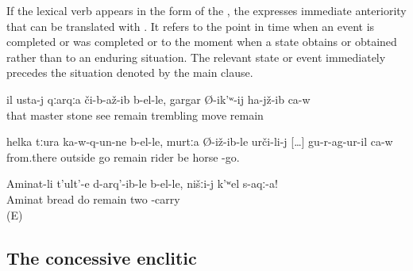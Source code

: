 If the lexical verb appears in the form of the , the  expresses immediate anteriority that can be translated with . It refers to the point in time when an event is completed or was completed or to the moment when a state obtains or obtained rather than to an enduring situation. The relevant state or event immediately precedes the situation denoted by the main clause.
%
\begin{exe}
	\ex	\label{ex:When / as soon as the master saw the stone, he trembled (started to tremble)}
	\gll	il	usta-j	qːarqːa	či-b-až-ib	b-el-le,	gargar	Ø-ik'ʷ-ij	ha-jž-ib	ca-w\\
		that	master	stone	see	remain	trembling	move	remain \\
	\glt	{}

	\ex	\label{ex:When / as soon as he went out from there, he mounted the horse}
	\gll	helka	tːura	ka-w-q-un-ne	b-el-le,	murtːa	Ø-iž-ib-le	urči-li-j [\ldots]	gu-r-ag-ur-il	ca-w\\
		from.there	outside	go	remain	rider	be	horse	{}	-go.	\\
	\glt	{}

	\ex	\label{ex:‎As soon as Aminat makes bread / finishes making bread}
	\gll	Aminat-li	t'ult'-e	d-arq'-ib-le	b-el-le,	nišːi-j	k'ʷel	s-aqː-a!\\
		Aminat	bread	do	remain		two	-carry\\
	\glt	{} (E)
\end{exe}



\subsection{The concessive enclitic  }
\label{sec:concessive enclitic =xar}


